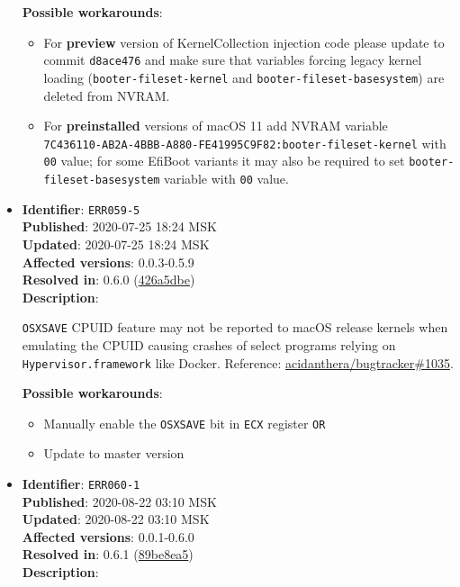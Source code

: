 \documentclass[]{article}
\providecommand{\tightlist}{%
  \setlength{\itemsep}{0pt}\setlength{\parskip}{0pt}}
\begin{document}
\begin{itemize}
  \textbf{Possible workarounds}:
  \begin{itemize}
    \tightlist
    \item For \textbf{preview} version of KernelCollection injection code please update
    to commit \texttt{d8ace476} and make sure that variables forcing legacy
    kernel loading (\texttt{booter-fileset-kernel} and \texttt{booter-fileset-basesystem})
    are deleted from NVRAM.
    \item For \textbf{preinstalled} versions of macOS 11 add NVRAM variable \\
    \texttt{7C436110-AB2A-4BBB-A880-FE41995C9F82:booter-fileset-kernel}
    with \texttt{00} value; for some EfiBoot variants it may also be
    required to set \texttt{booter-fileset-basesystem} variable with \texttt{00} value.
  \end{itemize}


\item
  \textbf{Identifier}: \texttt{ERR059-5} \\
  \textbf{Published}: 2020-07-25 18:24 MSK \\
  \textbf{Updated}: 2020-07-25 18:24 MSK \\
  \textbf{Affected versions}: 0.0.3-0.5.9 \\
  \textbf{Resolved in}: 0.6.0 (\href{https://github.com/acidanthera/OpenCorePkg/commit/426a5dbe09365d3fe1d18dbde9868fe12900c30c}{426a5dbe}) \\
  \textbf{Description}:

  \texttt{OSXSAVE} CPUID feature may not be reported to macOS release kernels when emulating the CPUID
  causing crashes of select programs relying on \texttt{Hypervisor.framework} like Docker. Reference:
  \href{https://github.com/acidanthera/bugtracker/issues/1035}{acidanthera/bugtracker\#1035}.

  \textbf{Possible workarounds}:
  \begin{itemize}
    \tightlist
    \item Manually enable the \texttt{OSXSAVE} bit in \texttt{ECX} register \texttt{OR}
    \item Update to master version
  \end{itemize}

\item
  \textbf{Identifier}: \texttt{ERR060-1} \\
  \textbf{Published}: 2020-08-22 03:10 MSK \\
  \textbf{Updated}: 2020-08-22 03:10 MSK \\
  \textbf{Affected versions}: 0.0.1-0.6.0 \\
  \textbf{Resolved in}: 0.6.1 (\href{https://github.com/acidanthera/OpenCorePkg/commit/89be8ea5bb98dc8c9eb49a5e29c5343643535ae4}{89be8ea5}) \\
  \textbf{Description}:


\end{itemize}
\end{document}
